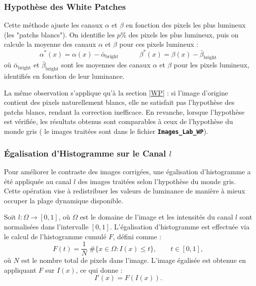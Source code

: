 \documentclass[10pt, a4paper]{extarticle}
\numberwithin{equation}{section}
\numberwithin{figure}{section}
\begin{document}
\subsubsection{Hypothèse des White Patches}  
\par Cette méthode ajuste les canaux \( \alpha \) et \( \beta \) en fonction des pixels les plus lumineux (les "patchs blancs"). On identifie les \( p\% \) des pixels les plus lumineux, puis on calcule la moyenne des canaux \( \alpha \) et \( \beta \) pour ces pixels lumineux :
   \[
   \alpha^*(x) = \alpha(x) - \bar{\alpha}_{\text{bright}} \quad\quad\quad \beta^*(x) = \beta(x) - \bar{\beta}_{\text{bright}}
   \]
   où \( \bar{\alpha}_{\text{bright}} \) et \( \bar{\beta}_{\text{bright}} \) sont les moyennes des canaux \( \alpha \) et \( \beta \) pour les pixels lumineux, identifiés en fonction de leur luminance.
\vspace{2mm}   
\par La même observation s'applique qu'à la section \ref{WP} : si l'image d'origine contient des pixels naturellement blancs, elle ne satisfait pas l'hypothèse des patchs blancs, rendant la correction inefficace. En revanche, lorsque l'hypothèse est vérifiée, les résultats obtenus sont comparables à ceux de l'hypothèse du monde gris ( le images traitées sont dans le fichier \colorbox{gray!15}{\texttt{\textbf{Images\_Lab\_WP}}}).

\subsubsection{Égalisation d'Histogramme sur le Canal \( l \)}

\par Pour améliorer le contraste des images corrigées, une égalisation d'histogramme a été appliquée au canal \( l \) des images traitées selon l'hypothèse du monde gris. Cette opération vise à redistribuer les valeurs de luminance de manière à mieux occuper la plage dynamique disponible.
\vspace{2mm}
\par Soit \( l : \Omega \to [0, 1] \), où \( \Omega \) est le domaine de l'image et les intensités du canal $l$ sont normalisées dans l'intervalle \([0, 1]\). L'égalisation d'histogramme est effectuée via le calcul de l'histogramme cumulé \( F \), défini comme :
\[
F(t) = \frac{1}{N} \; \# \{x \in \Omega : I(x) \leq t \}, \quad\quad t \in [0, 1],
\]
où \( N \) est le nombre total de pixels dans l'image. L'image égalisée est obtenue en appliquant \( F \) sur \( I(x) \), ce qui donne :
\[
I'(x) = F(I(x)).
\]
\end{document}
